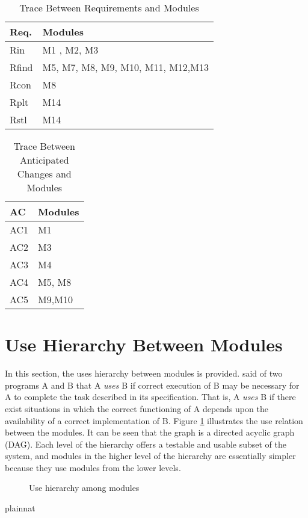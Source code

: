 \documentclass[12pt, titlepage]{article}
\begin{document}
\begin{table}[H]
\centering
\begin{tabular}{p{} p{}}
\toprule
\textbf{Req.} & \textbf{Modules}\\
\midrule
Rin & M1 , M2, M3 \\
Rfind & M5, M7, M8, M9, M10, M11, M12,M13\\
Rcon & M8\\
Rplt & M14 \\
Rstl & M14\\
\bottomrule
\end{tabular}
\caption{Trace Between Requirements and Modules}
\label{TblRT}
\end{table}

\begin{table}[H]
\centering
\begin{tabular}{p{} p{}}
\toprule
\textbf{AC} & \textbf{Modules}\\
\midrule
AC1 & M1\\
AC2 & M3\\
AC3 & M4\\
AC4 & M5, M8\\
AC5 & M9,M10\\
\bottomrule
\end{tabular}
\caption{Trace Between Anticipated Changes and Modules}
\label{TblACT}
\end{table}

\section{Use Hierarchy Between Modules} \label{SecUse}

In this section, the uses hierarchy between modules is
provided. \citet{Parnas1978} said of two programs A and B that A {\em uses} B if
correct execution of B may be necessary for A to complete the task described in
its specification. That is, A {\em uses} B if there exist situations in which
the correct functioning of A depends upon the availability of a correct
implementation of B.  Figure \ref{FigUH} illustrates the use relation between
the modules. It can be seen that the graph is a directed acyclic graph
(DAG). Each level of the hierarchy offers a testable and usable subset of the
system, and modules in the higher level of the hierarchy are essentially simpler
because they use modules from the lower levels.

\begin{figure}[H]
\centering
\caption{Use hierarchy among modules}
\label{FigUH}
\end{figure}


 {plainnat}

\end{document}
